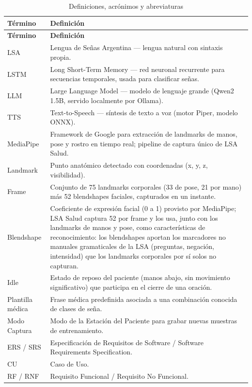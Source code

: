 \begin{longtable}{p{4cm} p{10cm}}
    \caption{Definiciones, acrónimos y abreviaturas}
    \label{tab:definiciones} \\
    \toprule
    \textbf{Término} & \textbf{Definición} \\
    \midrule
    \endfirsthead
    \toprule
    \textbf{Término} & \textbf{Definición} \\
    \midrule
    \endhead
    LSA & Lengua de Señas Argentina --- lengua natural con sintaxis propia. \\
    LSTM & Long Short-Term Memory --- red neuronal recurrente para secuencias temporales, usada para clasificar señas. \\
    LLM & Large Language Model --- modelo de lenguaje grande (Qwen2 1.5B, servido localmente por Ollama). \\
    TTS & Text-to-Speech --- síntesis de texto a voz (motor Piper, modelo ONNX). \\
    MediaPipe & Framework de Google para extracción de landmarks de manos, pose y rostro en tiempo real; pipeline de captura único de LSA Salud. \\
    Landmark & Punto anatómico detectado con coordenadas (x, y, z, visibilidad). \\
    Frame & Conjunto de 75 landmarks corporales (33 de pose, 21 por mano) más 52 blendshapes faciales, capturados en un instante. \\
    Blendshape & Coeficiente de expresión facial (0 a 1) provisto por MediaPipe; LSA Salud captura 52 por frame y los usa, junto con los landmarks de manos y pose, como características de reconocimiento: los blendshapes aportan los marcadores no manuales gramaticales de la LSA (preguntas, negación, intensidad) que los landmarks corporales por sí solos no capturan. \\
    Idle & Estado de reposo del paciente (manos abajo, sin movimiento significativo) que participa en el cierre de una oración. \\
    Plantilla médica & Frase médica predefinida asociada a una combinación conocida de clases de seña. \\
    Modo Captura & Modo de la Estación del Paciente para grabar nuevas muestras de entrenamiento. \\
    ERS / SRS & Especificación de Requisitos de Software / Software Requirements Specification. \\
    CU & Caso de Uso. \\
    RF / RNF & Requisito Funcional / Requisito No Funcional. \\

\end{longtable}
